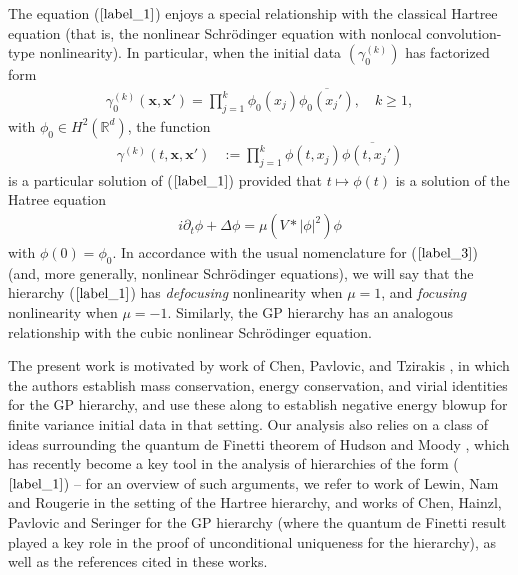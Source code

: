 \documentclass[reqno]{amsart}
\numberwithin{equation}{section}
\theoremstyle{remark}
\begin{document}
The equation ($\ref{label_1}$) enjoys a special relationship with the classical Hartree equation (that is, the nonlinear Schr\"odinger equation with nonlocal convolution-type nonlinearity).  In particular, when the initial data $(\gamma_0^{(k)})$ has factorized form 
\begin{align*}
\gamma_{0}^{(k)}({\mathbf x},{\mathbf x}')=\prod_{j=1}^k \phi_0(x_j)\overline{\phi_0(x_j')},\quad k\geq 1,
\end{align*}
with $\phi_0\in H^2(\mathbb{R}^d)$, the function
\begin{align} 
\gamma^{(k)}(t,{\mathbf x},{\mathbf x}')&:=\prod_{j=1}^k \phi(t,x_j)\overline{\phi(t,x_j')}\label{label_2}
\end{align}
is a particular solution of ($\ref{label_1}$) provided that $t\mapsto \phi(t)$ is a solution of the Hatree equation
\begin{align}
\label{label_3}i\partial_t\phi+\Delta \phi=\mu (V*|\phi|^2)\phi
\end{align}
with $\phi(0)=\phi_0$.  In accordance with the usual nomenclature for ($\ref{label_3}$) (and, more generally, nonlinear Schr\"odinger equations), we will say that the hierarchy ($\ref{label_1}$) has {\it defocusing} nonlinearity when $\mu=1$, and {\it focusing} nonlinearity when $\mu=-1$.  Similarly, the GP hierarchy has an analogous relationship with the cubic nonlinear Schr\"odinger equation.

\vspace{0.2in}

The present work is motivated by work of Chen, Pavlovic, and Tzirakis \cite{CPT}, in which the authors establish mass conservation, energy conservation, and virial identities for the GP hierarchy, and use these along to establish negative energy blowup for finite variance initial data in that setting.  Our analysis also relies on a class of ideas surrounding the quantum de Finetti theorem of Hudson and Moody \cite{HM}, which has recently become a key tool in the analysis of hierarchies of the form ($\ref{label_1}$) -- for an overview of such arguments, we refer to work of Lewin, Nam and Rougerie \cite{LNR} in the setting of the Hartree hierarchy, and works of Chen, Hainzl, Pavlovic and Seringer \cite{CHPS,CHPS2} for the GP hierarchy (where the quantum de Finetti result played a key role in the proof of unconditional uniqueness for the hierarchy), as well as the references cited in these works.  

\vspace{0.2in}
\end{document}
